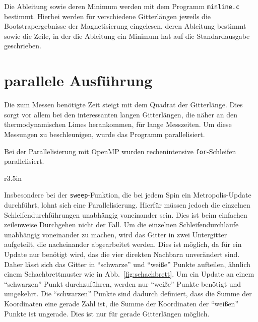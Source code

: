 	Die Ableitung sowie deren Minimum werden mit dem Programm \texttt{minline.c} bestimmt. Hierbei werden für verschiedene Gitterlängen jeweils die Bootstrapergebnisse der Magnetisierung eingelesen, deren Ableitung bestimmt sowie die Zeile, in der die Ableitung ein Minimum hat auf die Standardausgabe geschrieben.
		
	
	\section{parallele Ausführung}
	\label{sec:parallelimplementierung}


	
	Die zum Messen benötigte Zeit steigt mit dem Quadrat der Gitterlänge. Dies sorgt vor allem bei den interessanten langen Gitterlängen, die näher an den thermodynamischen Limes herankommen, für lange Messzeiten. Um diese Messungen zu beschleunigen, wurde das Programm parallelisiert.
	
	Bei der Parallelisierung mit OpenMP wurden rechenintensive \texttt{for}-Schleifen parallelisiert.
	
	
	\begin{wrapfigure}{r}{3.5in}
		\centering
		
		\caption{Schachbrettmuster}
		\label{fig:schachbrett}
	\end{wrapfigure}
	
	Insbesondere bei der \texttt{sweep}-Funktion, die bei jedem Spin ein Metropolis-Update durchführt, lohnt sich eine Parallelisierung. Hierfür müssen jedoch die einzelnen Schleifendurchführungen unabhängig voneinander sein. Dies ist beim einfachen zeilenweise Durchgehen nicht der Fall.
	Um die einzelnen Schleifendurchläufe unabhängig voneinander zu machen, wird das Gitter in zwei Untergitter aufgeteilt, die nacheinander abgearbeitet werden. Dies ist möglich, da für ein Update nur benötigt wird, das die vier direkten Nachbarn unverändert sind. Daher lässt sich das Gitter in \enquote{schwarze}
	und \enquote{weiße} Punkte aufteilen, ähnlich einem Schachbrettmuster wie in Abb.~\ref{fig:schachbrett}. Um ein Update an einem \enquote{schwarzen} Punkt durchzuführen, werden nur \enquote{weiße} Punkte benötigt und umgekehrt. Die \enquote{schwarzen} Punkte sind dadurch definiert, dass die Summe der Koordinaten eine gerade Zahl ist, die Summe der Koordinaten der \enquote{weißen} Punkte ist ungerade. Dies ist nur für gerade Gitterlängen möglich.
	
